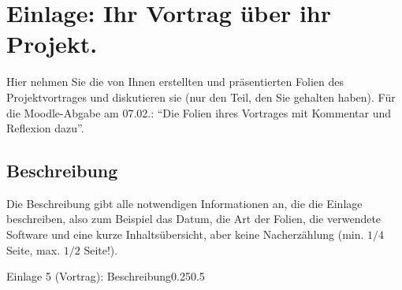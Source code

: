 \section{Einlage: Ihr Vortrag über ihr Projekt.}
\label{sec:vortrag}

\begin{hinweise}
Hier nehmen Sie die von Ihnen erstellten und präsentierten Folien des Projektvortrages und diskutieren sie
(nur den Teil, den Sie gehalten haben). Für die Moodle-Abgabe am 07.02.: \enquote{Die Folien ihres Vortrages
mit Kommentar und Reflexion dazu}.
\end{hinweise}

\subsection{Beschreibung}
\begin{hinweise}
Die Beschreibung gibt alle notwendigen Informationen an, die die Einlage beschreiben, also zum Beispiel das
Datum, die Art der Folien, die verwendete Software und eine kurze Inhaltsübersicht, aber keine Nacherzählung
(min. $1/4$ Seite, max. $1/2$ Seite!).
\end{hinweise}
\begin{umfang}{Einlage 5 (Vortrag): Beschreibung}{0.25}{0.5}
\end{umfang}

